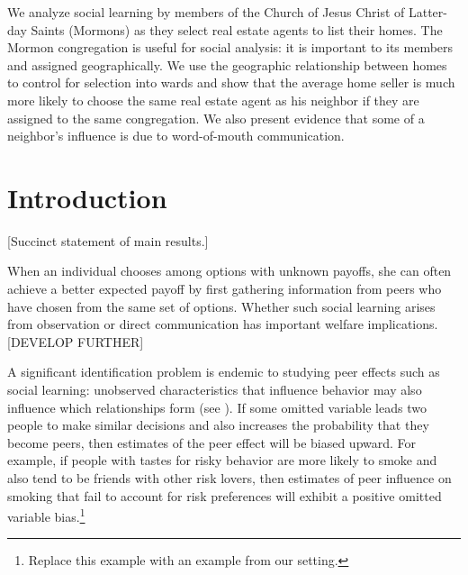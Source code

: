 \documentclass[12pt]{article}
\begin{document}
{\abstract
    We analyze social learning by members of the Church of Jesus Christ of Latter-day Saints (Mormons) as they select real estate agents to list their homes. The Mormon congregation is useful for social analysis: it is important to its members and assigned geographically. We use the geographic relationship between homes to control for selection into wards and show that the average home seller is much more likely to choose the same real estate agent as his neighbor if they are assigned to the same congregation. We also present evidence that some of a neighbor's influence is due to word-of-mouth communication.
}



\section{Introduction}
	[Succinct statement of main results.]

    When an individual chooses among options with unknown payoffs, she can often achieve a better expected payoff by first gathering information from peers who have chosen from the same set of options. Whether such social learning arises from observation or direct communication has important welfare implications. [DEVELOP FURTHER]
    
    A significant identification problem is endemic to studying peer effects such as social learning: unobserved characteristics that influence behavior may also influence which relationships form (see ). If some omitted variable leads two people to make similar decisions and also increases the probability that they become peers, then estimates of the peer effect will be biased upward. For example, if people with tastes for risky behavior are more likely to smoke and also tend to be friends with other risk lovers, then estimates of peer influence on smoking that fail to account for risk preferences will exhibit a positive omitted variable bias.\footnote{Replace this example with an example from our setting.}
\end{document}
